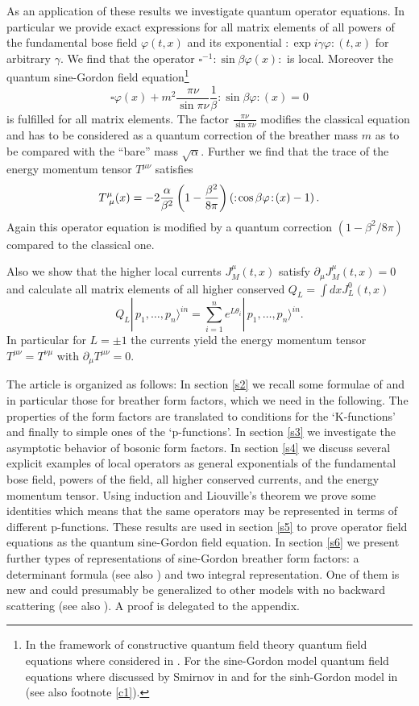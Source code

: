 \documentclass[a4paper,a4paper]{article}
\begin{document}
As an application of these results we investigate quantum operator
equations. In particular we provide exact expressions for all matrix
elements of all powers of the fundamental bose field $\varphi (t,x)$ and its
exponential $:\!\exp i\gamma \varphi \!:\!(t,x)$ for arbitrary $\gamma $. We
find that the operator $\square ^{-1}\!:\!\sin \beta \varphi (x)\!:$ is
local. Moreover the quantum sine-Gordon field equation\footnote{%
In the framework of constructive quantum field theory quantum field
equations where considered in \cite{Sch,F}. For the sine-Gordon model
quantum field equations where discussed by Smirnov in \cite{Sm1} and for the
sinh-Gordon model in \cite{MS} (see also footnote \ref{c1}).} 
\[
\square \varphi (x)+m^{2}\frac{\pi \nu }{\sin \pi \nu }\frac{1}{\beta }%
:\!\sin \beta \varphi \!:\!(x)=0 
\]
is fulfilled for all matrix elements. The factor $\frac{\pi \nu }{\sin \pi
\nu }$ modifies the classical equation and has to be considered as a quantum
correction of the breather mass $m$ as to be compared with the ``bare'' mass 
$\sqrt{\alpha }$. Further we find that the trace of the energy momentum
tensor $T^{\mu \nu }$ satisfies 
\[
T_{~\mu }^{\mu }(x)=-2\frac{\alpha }{\beta ^{2}}\left( 1-\frac{\beta ^{2}}{%
8\pi }\right) \left( :\!\cos \beta \varphi \!:\!(x)-1\right) . 
\]
Again this operator equation is modified by a quantum correction $(1-\beta
^{2}/8\pi )$ compared to the classical one.

Also we show that the higher local currents $J_{M}^{\mu }(t,x)$ satisfy $%
\partial _{\mu }J_{M}^{\mu }(t,x)=0$ and calculate all matrix elements of
all higher conserved $Q_{L}=\int dxJ_{L}^{0}(t,x)$%
\begin{equation}
Q_{L}|\,p_{1},\dots ,p_{n}\rangle ^{in}=\sum_{i=1}^{n}e^{L\theta
_{i}}|\,p_{1},\dots ,p_{n}\rangle ^{in}.  \label{J}
\end{equation}
In particular for $L=\pm 1$ the currents yield the energy momentum tensor $%
T^{\mu \nu }=T^{\nu \mu }$ with $\partial _{\mu }T^{\mu \nu }=0$.

The article is organized as follows: In section \ref{s2} we recall some
formulae of \cite{BFKZ,BK} and in particular those for breather form
factors, which we need in the following. The properties of the form factors
are translated to conditions for the `K-functions' and finally to simple
ones of the `p-functions'. In section \ref{s3} we investigate the asymptotic
behavior of bosonic form factors. In section \ref{s4} we discuss several
explicit examples of local operators as general exponentials of the
fundamental bose field, powers of the field, all higher conserved currents,
and the energy momentum tensor. Using induction and Liouville's theorem we
prove some identities which means that the same operators may be represented
in terms of different p-functions. These results are used in section \ref{s5}
to prove operator field equations as the quantum sine-Gordon field equation.
In section \ref{s6} we present further types of representations of
sine-Gordon breather form factors: a determinant formula (see also \cite
{Sm1,AlZa1,FMS,KM}) and two integral representation. One of them is new and
could presumably be generalized to other models with no backward scattering
(see also \cite{Fr}). A proof is delegated to the appendix.
\end{document}
